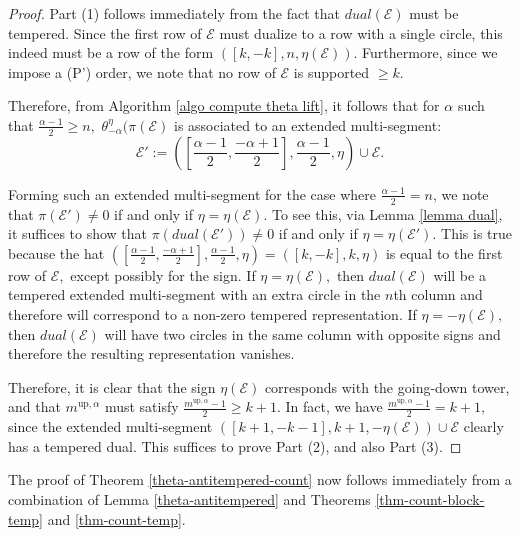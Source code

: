 \documentclass[11pt,letterpaper]{amsart}
\newcommand{\up}{{\mathrm{up}}}
\numberwithin{equation}{section}
\begin{document}
\begin{proof}
    Part (1) follows immediately from the fact that $dual(\mathcal{E})$ must be tempered. Since the first row of $\mathcal{E}$ must dualize to a row with a single circle, this indeed must be a row of the form $([k, -k], n, \eta(\mathcal{E})).$ Furthermore, since we impose a (P') order, we note that no row of $\mathcal{E}$ is supported $\geq k.$

    Therefore, from Algorithm \ref{algo compute theta lift}, it follows that for $\alpha$ such that $\frac{\alpha - 1}{2} \geq n,$ $\theta_{-\alpha}^\eta(\pi(\mathcal{E})$ is associated to an extended multi-segment:
    $$\mathcal{E}' := \left( \left[ \frac{\alpha - 1}{2}, \frac{-\alpha + 1}{2}\right], \frac{\alpha - 1}{2}, \eta   \right) \cup \mathcal{E}.$$

    Forming such an extended multi-segment for the case where $\frac{\alpha - 1}{2} = n$, we note that $\pi(\mathcal{E}') \neq 0$ if and only if $\eta = \eta(\mathcal{E}).$ To see this, via Lemma \ref{lemma dual}, it suffices to show that $\pi(dual(\mathcal{E}')) \neq 0$ if and only if $\eta = \eta(\mathcal{E}').$ This is true because the hat $\left( \left[ \frac{\alpha - 1}{2}, \frac{-\alpha + 1}{2}\right], \frac{\alpha - 1}{2}, \eta   \right) = ([k, -k], k, \eta)$ is equal to the first row of $\mathcal{E},$ except possibly for the sign. If $\eta = \eta(\mathcal{E}),$ then $dual(\mathcal{E})$ will be a tempered extended multi-segment with an extra circle in the $n$th column and therefore will correspond to a non-zero tempered representation. If $\eta = -\eta(\mathcal{E}),$ then $dual(\mathcal{E})$ will have two circles in the same column with opposite signs and therefore the resulting representation vanishes.

    Therefore, it is clear that the sign $\eta(\mathcal{E})$ corresponds with the going-down tower, and that $m^{\up, \alpha}$ must satisfy $\frac{m^{\up, \alpha} - 1}{2} \geq k + 1.$ In fact, we have $\frac{m^{\up, \alpha} - 1}{2} = k + 1,$ since the extended multi-segment $([k + 1, -k - 1], k + 1, -\eta(\mathcal{E})) \cup \mathcal{E}$ clearly has a tempered dual. This suffices to prove Part (2), and also Part (3).
\end{proof}

The proof of Theorem \ref{theta-antitempered-count} now follows immediately from a combination of Lemma \ref{theta-antitempered} and Theorems \ref{thm-count-block-temp} and \ref{thm-count-temp}.

\appendix
\end{document}

